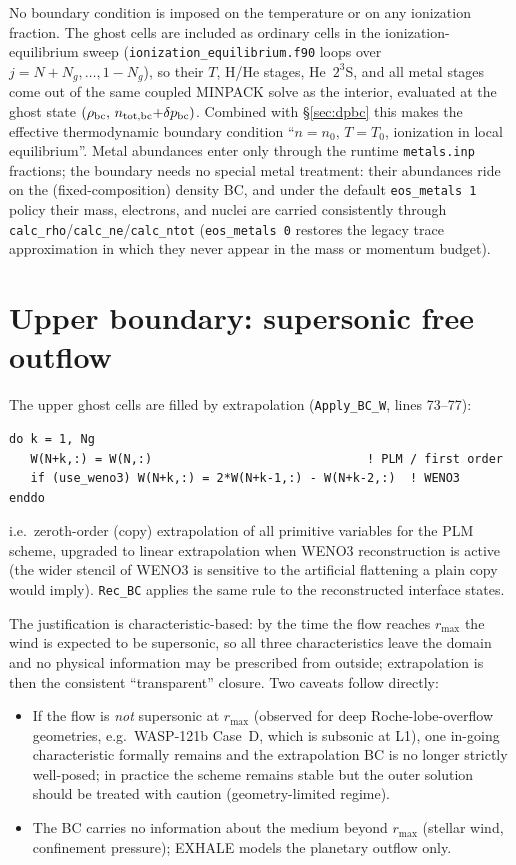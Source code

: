 \documentclass[english,a4paper]{kiseon_memo}
\begin{document}
No boundary condition is imposed on the temperature or on any
ionization fraction. The ghost cells are included as ordinary cells in
the ionization-equilibrium sweep
(\texttt{ionization\_equilibrium.f90} loops over
$j = N{+}N_g,\dots,1{-}N_g$), so their $T$, H/He stages, He~$2^3$S,
and all metal stages come out of the same coupled MINPACK solve as the
interior, evaluated at the ghost state $(\rho_{\rm bc},\,
n_{\rm tot,bc}{+}\delta p_{\rm bc})$. Combined with \S\ref{sec:dpbc} this makes the
effective thermodynamic boundary condition ``$n = n_0$, $T = T_0$,
ionization in local equilibrium''. Metal abundances enter only through
the runtime \texttt{metals.inp} fractions; the boundary needs no
special metal treatment: their abundances ride on the (fixed-composition)
density BC, and under the default \texttt{eos\_metals 1} policy their
mass, electrons, and nuclei are carried consistently through
\texttt{calc\_rho}/\texttt{calc\_ne}/\texttt{calc\_ntot}
(\texttt{eos\_metals 0} restores the legacy trace approximation in
which they never appear in the mass or momentum budget).

\section{Upper boundary: supersonic free outflow}
\label{sec:upper}

The upper ghost cells are filled by extrapolation
(\texttt{Apply\_BC\_W}, lines 73--77):
\begin{lstlisting}[style=code]
do k = 1, Ng
   W(N+k,:) = W(N,:)                              ! PLM / first order
   if (use_weno3) W(N+k,:) = 2*W(N+k-1,:) - W(N+k-2,:)  ! WENO3
enddo
\end{lstlisting}
i.e.\ zeroth-order (copy) extrapolation of all primitive variables for
the PLM scheme, upgraded to linear extrapolation when WENO3
reconstruction is active (the wider stencil of WENO3 is sensitive to
the artificial flattening a plain copy would imply). \texttt{Rec\_BC}
applies the same rule to the reconstructed interface states.

The justification is characteristic-based: by the time the flow
reaches $r_{\max}$ the wind is expected to be supersonic, so all three
characteristics leave the domain and no physical information may be
prescribed from outside; extrapolation is then the consistent
``transparent'' closure. Two caveats follow directly:
\begin{itemize}
\item If the flow is \emph{not} supersonic at $r_{\max}$ (observed for
  deep Roche-lobe-overflow geometries, e.g.\ WASP-121b Case~D, which
  is subsonic at L1), one in-going characteristic formally remains and
  the extrapolation BC is no longer strictly well-posed; in practice
  the scheme remains stable but the outer solution should be treated
  with caution (geometry-limited regime).
\item The BC carries no information about the medium beyond $r_{\max}$
  (stellar wind, confinement pressure); EXHALE models the planetary
  outflow only.
\end{itemize}
\end{document}
